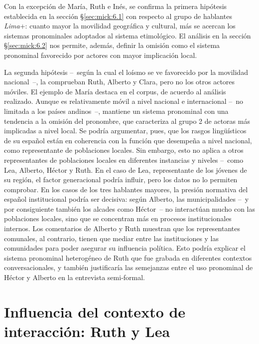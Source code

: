 \documentclass[output=paper]{../langscibook}
\begin{document}
Con la excepción de María, Ruth e Inés, se confirma la primera hipótesis establecida en la sección §\ref{sec:mick:6.1} con respecto al grupo de hablantes \textit{Lima}+: cuanto mayor la movilidad geográfica y cultural, más se acercan los sistemas pronominales adoptados al sistema etimológico. El análisis en la sección §\ref{sec:mick:6.2} nos permite, además, definir la omisión como el sistema pronominal favorecido por actores con mayor implicación local.

La segunda hipótesis -- según la cual el loísmo se ve favorecido por la movilidad nacional --, la comprueban Ruth, Alberto y Clara, pero no los otros actores móviles. El ejemplo de María destaca en el corpus, de acuerdo al análisis realizado. Aunque es relativamente móvil a nivel nacional e internacional -- no limitada a los países andinos --, mantiene un sistema pronominal con una tendencia a la omisión del pronombre, que caracteriza al grupo 2 de actoras más implicadas a nivel local. Se podría argumentar, pues, que los rasgos lingüísticos de su español están en coherencia con la función que desempeña a nivel nacional, como representante de poblaciones locales. Sin embargo, esto no aplica a otros representantes de poblaciones locales en diferentes instancias y niveles – como Lea, Alberto, Héctor y Ruth. En el caso de Lea, representante de los jóvenes de su región, el factor generacional podría influir, pero los datos no lo permiten comprobar. En los casos de los tres hablantes mayores, la presión normativa del español institucional podría ser decisiva: según Alberto, las municipalidades – y por consiguiente también los alcades como Héctor – no interactúan mucho con las poblaciones locales, sino que se concentran más en procesos institucionales internos. Los comentarios de Alberto y Ruth muestran que los representantes comunales, al contrario, tienen que mediar entre las instituciones y las comunidades para poder asegurar su influencia política. Esto podría explicar el sistema pronominal heterogéneo de Ruth que fue grabada en diferentes contextos conversacionales, y también justificaría las semejanzas entre el uso pronominal de Héctor y Alberto en la entrevista semi-formal.


\section{Influencia del contexto de interacción: Ruth y Lea}\label{sec:mick:7}
\end{document}
